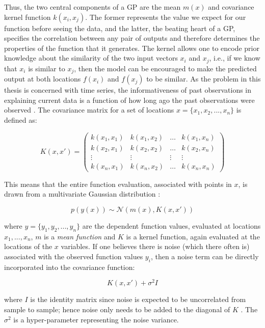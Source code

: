 Thus, the two central components of a GP are the mean $m(x)$ and covariance kernel function $k(x_i, x_j)$. The former represents the value we expect for our function before seeing the data, and the latter, the beating heart of a GP, specifies the correlation between any pair of outputs and therefore determines the properties of the function that it generates. The kernel allows one to encode prior knowledge about the similarity of the two input vectors $x_i$ and $x_j$, i.e., if we know that $x_i$ is similar to $x_j$, then the model can be encouraged to make the predicted output at both locations $f(x_i)$ and $f(x_j)$ to be similar. As the problem in this thesis is concerned with time series, the informativeness of past observations in explaining current data is a function of how long ago the past observations were observed \cite{roberts_gaussian_2013}. The covariance matrix for a set of locations $x = \{x_1, x_2, . . .,x_n\}$ is defined as:

\begin{equation}
K(x, x') = \begin{pmatrix}
k(x_1, x_1) & k(x_1, x_2) & \dots & k(x_1, x_n) \\
k(x_2, x_1) & k(x_2, x_2) & \dots & k(x_2, x_n) \\
\vdots & \vdots & \vdots & \vdots \\
k(x_n, x_1) & k(x_n, x_2) & \dots & k(x_n, x_n)
\end{pmatrix}
\end{equation}

This means that the entire function evaluation, associated with points in $x$, is drawn from a multivariate Gaussian distribution \cite{roberts_gaussian_2013}:

\begin{equation}
p(y(x)) \sim \mathcal{N}(m(x), K(x, x'))
\end{equation}

where $y = \{y_1, y_2,. . .,y_n\}$ are the dependent function values, evaluated at locations $x_1,. . .,x_n$, $m$ is a \textit{mean function} and $K$ is a kernel function, again evaluated at the locations of the $x$ variables. If one believes there is noise (which there often is) associated with the observed function values $y_i$, then a noise term can be directly incorporated into the covariance function:

\begin{equation}
K(x, x') + \sigma^2I
\end{equation}

where $I$ is the identity matrix since noise is expected to be uncorrelated from sample to sample; hence noise only needs to be added to the diagonal of $K$ \cite{roberts_gaussian_2013}. The $\sigma^2$ is a hyper-parameter representing the noise variance.

